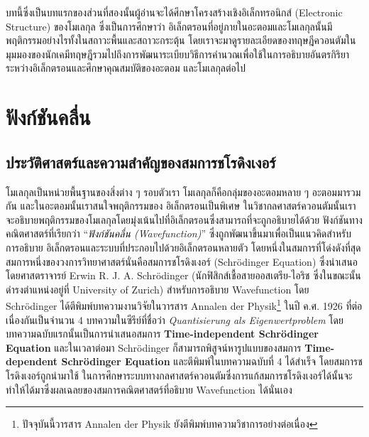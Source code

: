 บทนี้ซึ่งเป็นบทแรกของส่วนที่สองนั้นผู้อ่านจะได้ศึกษาโครงสร้างเชิงอิเล็กทรอนิกส์ (Electronic Structure) ของโมเลกุล ซึ่งเป็นการศึกษาว่า%
อิเล็กตรอนที่อยู่ภายในอะตอมและโมเลกุลนั้นมีพฤติกรรมอย่างไรทั้งในสถาวะพื้นและสถาวะกระตุ้น โดยเราจะมาดูรายละเอียดของทฤษฎีควอนตัมใน%
มุมมองของนักเคมีทฤษฎีรวมไปถึงการพัฒนาระเบียบวิธีการคำนวณเพื่อใช้ในการอธิบายอันตรกิริยาระหว่างอิเล็กตรอนและศึกษาคุณสมบัติของอะตอม%
และโมเลกุลต่อไป

\section{ฟังก์ชันคลื่น}
\label{sec:wavefunction}

\subsection{ประวัติศาสตร์และความสำคัญของสมการชโรดิงเงอร์}
\label{ssec:schrodinger_eq}

โมเลกุลเป็นหน่วยพื้นฐานของสิ่งต่าง ๆ รอบตัวเรา โมเลกุลก็คือกลุ่มของอะตอมหลาย ๆ อะตอมมารวมกัน และในอะตอมนั้นเราสนใจพฤติกรรมของ%
อิเล็กตรอนเป็นพิเศษ ในวิชากลศาสตร์ควอนตัมนั้นเราจะอธิบายพฤติกรรมของโมเลกุลโดยมุ่งเน้นไปที่อิเล็กตรอนซึ่งสามารถที่จะถูกอธิบายได้ด้วย%
ฟังก์ชันทางคณิตศาสตร์ที่เรียกว่า \enquote{\textit{ฟังก์ชันคลื่น (Wavefunction)}} ซึ่งถูกพัฒนาขึ้นมาเพื่อเป็นแนวคิดสำหรับการอธิบาย%
อิเล็กตรอนและระบบที่ประกอบไปด้วยอิเล็กตรอนหลายตัว โดยหนึ่งในสมการที่โด่งดังที่สุดสมการหนึ่งของวงการวิทยาศาสตร์นั่นคือสมการชโรดิงเงอร์ 
(Schr\"{o}dinger Equation)\autocite{schleich2013} ซึ่งนำเสนอโดยศาสตราจารย์ Erwin R. J. A. Schr\"{o}dinger 
(นักฟิสิกส์เชื้อสายออสเตรีย-ไอริช ซึ่งในขณะนั้นดำรงตำแหน่งอยู่ที่ University of Zurich) สำหรับการอธิบาย Wavefunction 
โดย Schr\"{o}dinger ได้ตีพิมพ์บทความงานวิจัยในวารสาร Annalen der Physik\footnote{ปัจจุบันนี้วารสาร Annalen der Physik 
ยังตีพิมพ์บทความวิชาการอย่างต่อเนื่อง} ในปี ค.ศ. 1926 ที่ต่อเนื่องกันเป็นจำนวน 4 บทความในซีรีย์ที่ชื่อว่า \textit{Quantisierung als 
Eigenwertproblem} โดยบทความฉบับแรกนั้นเป็นการนำเสนอสมการ \textbf{Time-independent Schr\"{o}dinger Equation}%
\autocite{schrodinger1926} และในเวลาต่อมา Schr\"{o}dinger ก็สามารถพิสูจน์หารูปแบบของสมการ \textbf{Time-dependent 
Schr\"{o}dinger Equation} และตีพิมพ์ในบทความฉบับที่ 4 ได้สำเร็จ\autocite{schrodinger1926a} โดยสมการชโรดิงเงอร์ถูกนำมาใช้%
ในการศึกษาระบบทางกลศาสตร์ควอนตัมซึ่งการแก้สมการชโรดิงเงอร์ได้นั้นจะทำให้ได้มาซึ่งผลเฉลยของสมการคณิตศาสตร์ที่อธิบาย Wavefunction 
ได้นั่นเอง

